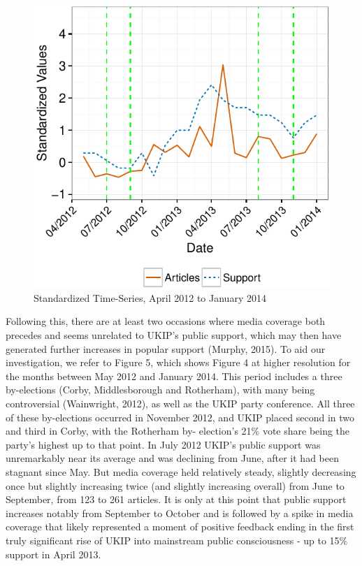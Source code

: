 \documentclass[12pt,article]{article}
\begin{document}
\begin{figure}[htbp]
\centering
\includegraphics{ukip_media_files/figure-latex/unnamed-chunk-10-1.pdf}
\caption{Standardized Time-Series, April 2012 to January 2014}
\end{figure}

Following this, there are at least two occasions where media coverage
both precedes and seems unrelated to UKIP's public support, which may
then have generated further increases in popular support (Murphy, 2015).
To aid our investigation, we refer to Figure 5, which shows Figure 4 at
higher resolution for the months between May 2012 and January 2014. This
period includes a three by-elections (Corby, Middlesborough and
Rotherham), with many being controversial (Wainwright, 2012), as well as
the UKIP party conference. All three of these by-elections occurred in
November 2012, and UKIP placed second in two and third in Corby, with
the Rotherham by- election's 21\% vote share being the party's highest
up to that point. In July 2012 UKIP's public support was unremarkably
near its average and was declining from June, after it had been stagnant
since May. But media coverage held relatively steady, slightly
decreasing once but slightly increasing twice (and slightly increasing
overall) from June to September, from 123 to 261 articles. It is only at
this point that public support increases notably from September to
October and is followed by a spike in media coverage that likely
represented a moment of positive feedback ending in the first truly
significant rise of UKIP into mainstream public consciousness - up to
15\% support in April 2013.
\end{document}
